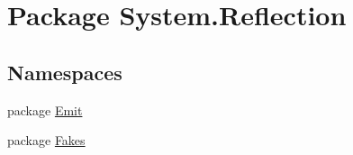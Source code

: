 \hypertarget{namespace_system_1_1_reflection}{\section{Package System.\-Reflection}
\label{namespace_system_1_1_reflection}
}
\subsection*{Namespaces}
\begin{DoxyCompactItemize}
\item 
package \hyperlink{namespace_system_1_1_reflection_1_1_emit}{Emit}
\item 
package \hyperlink{namespace_system_1_1_reflection_1_1_fakes}{Fakes}
\end{DoxyCompactItemize}
